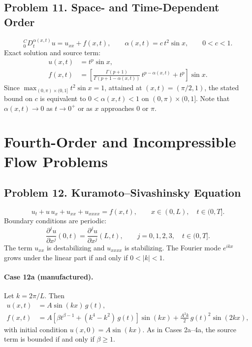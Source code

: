 \documentclass[11pt]{article}
\newcommand{\Caputo}[1]{{}^{C}_{0}D_t^{#1}}
\begin{document}
\subsection*{Problem 11. Space- and Time-Dependent Order}

\[
\boxed{\Caputo{\alpha(x,t)}u=u_{xx}+f(x,t)},
\qquad \alpha(x,t)=c\,t^2\sin x,
\qquad 0<c<1.
\]
Exact solution and source term:
\[
\begin{aligned}
u(x,t)&=t^p\sin x,\\
f(x,t)&=
\left[
\frac{\Gamma(p+1)}{\Gamma(p+1-\alpha(x,t))}\,
t^{p-\alpha(x,t)}+t^p
\right]\sin x.
\end{aligned}
\]
Since $\max_{(0,\pi)\times(0,1]}t^2\sin x=1$, attained at
$(x,t)=(\pi/2,1)$, the stated bound on $c$ is equivalent to
$0<\alpha(x,t)<1$ on $(0,\pi)\times(0,1]$. Note that $\alpha(x,t)\to0$
as $t\to0^+$ or as $x$ approaches $0$ or $\pi$.

\section{Fourth-Order and Incompressible Flow Problems}

\subsection*{Problem 12. Kuramoto--Sivashinsky Equation}

\[
\boxed{u_t+u\,u_x+u_{xx}+u_{xxxx}=f(x,t)},
\qquad x\in(0,L),
\quad t\in(0,T].
\]
Boundary conditions are periodic:
\[
\frac{\partial^j u}{\partial x^j}(0,t)=\frac{\partial^j u}{\partial x^j}(L,t),
\qquad j=0,1,2,3,
\quad t\in(0,T].
\]
The term $u_{xx}$ is destabilizing and $u_{xxxx}$ is stabilizing. The
Fourier mode $e^{ikx}$ grows under the linear part if and only if
$0<|k|<1$.

\paragraph{Case 12a (manufactured).}
Let $k=2\pi/L$. Then
\[
\begin{aligned}
u(x,t)&=A\sin(kx)\,g(t),\\
f(x,t)&=A\left[\beta t^{\beta-1}+(k^4-k^2)\,g(t)\right]\sin(kx)
+\frac{A^2k}{2}\,g(t)^2\sin(2kx),
\end{aligned}
\]
with initial condition $u(x,0)=A\sin(kx)$. As in Cases 2a--4a, the
source term is bounded if and only if $\beta\ge1$.
\end{document}
